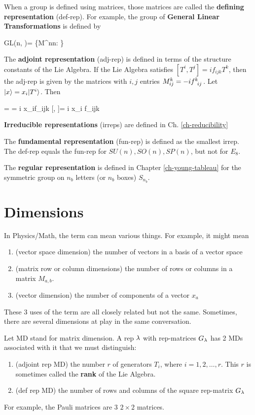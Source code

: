 When a group is 
defined using matrices, those
matrices are called the {\bf defining representation} (def-rep). For example,
the group
of {\bf General Linear Transformations}
is defined by

\beq
GL(n, \CC)=
\{M\in \CC^{n\times n}: \}
\eeq

The {\bf adjoint representation} (adj-rep)
is defined in terms of the structure constants
of the Lie Algebra. If the Lie Algebra satisfies
$[T^i, T^j]= if_{ijk}T^k$,
then the adj-rep is given by the matrices
with $i,j$ entries $M^k_{ij}=-if\indices{^k_i_j}$.
Let  $|x\rangle = x_i |T^i\rangle$.
Then

   = 
\ket{[x, T^j]}= i x_if_{ijk} \implies
{}[, \cdot]= 
i x_i f_{ijk}
\eeq


{\bf Irreducible representations} (irreps)
are defined in Ch. \ref{ch-reducibility}

The {\bf fundamental representation} (fun-rep)
is defined as the smallest irrep.
The def-rep equals the fun-rep for
$SU(n), SO(n), SP(n)$, but not for $E_8$.

The {\bf regular representation}
is defined in Chapter \ref{ch-young-tableau}
 for the symmetric group on $n_b$
letters (or $n_b$ boxes) $S_{n_b}$.

\section{Dimensions}\label{sec-dimensions}
In Physics/Math, the term  can mean
various things. For
example, it might mean
\begin{enumerate}
\item (vector space dimension) the number of vectors
in a basis of a vector space
\item (matrix row or column dimensions)
the number of rows or columns
in a matrix $M_{a,b}$.
\item (vector dimension) the number of components of a vector $x_a$ 
\end{enumerate}
These 3 uses of the term  are all
closely related but not the same. Sometimes,
there are several
dimensions
at play in the same
conversation.

Let MD stand for
matrix dimension.
A rep $\lambda$ with 
rep-matrices $G_\lambda$
has 2 MDs associated with it that we must distinguish: 
\begin{enumerate}
\item (adjoint rep MD) the number $r$ of generators $T_i$, where $i=1,2, \ldots, r$. This $r$ is sometimes called
the {\bf rank} of the Lie Algebra.
\item (def rep MD)
the number of rows and columns
of the square rep-matrix $G_\lambda$
\end{enumerate}
For example,
 the Pauli matrices
are 3 $2\times 2$ matrices.


